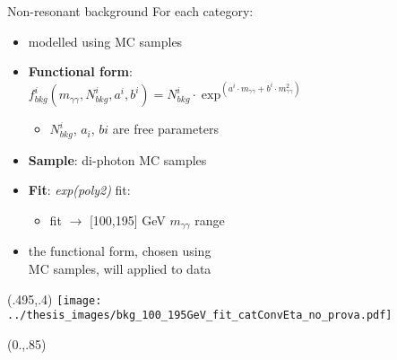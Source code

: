 \documentclass[10pt,UKenglish, leqno, xcolor = dvipsnames]{beamer}
\begin{document}
	\begin{frame}{Non-resonant background}
		\vfill
		For each category:
		\begin{itemize}
			\item modelled using MC samples
			\item \textbf{Functional form}:\\ $f^i_{bkg}(m_{\gamma\gamma},N_{bkg}^i,a^i,b^i) = N_{bkg}^i\cdot\exp^{(a^i\cdot m_{\gamma\gamma}+b^i\cdot m_{\gamma\gamma}^2)}$
			\begin{itemize}
				\item $N^{i}_{bkg}$, $a_i$, $bi$ are free parameters
			\end{itemize} 
			\item \textbf{Sample}: di-photon MC samples
			\item \textbf{Fit}: \textit{exp(poly2)} fit:
			\begin{itemize}
				\item fit $\to$  [100,195] GeV $m_{\gamma\gamma}$ range
			\end{itemize}
			\item the functional form, chosen using\\ MC samples, will applied to data
		\end{itemize}
		\vspace{.5cm}
		\vfill
		\begin{textblock}{1}(.495,.4)
			\texttt{[image: ../thesis\_images/bkg\_100\_195GeV\_fit\_catConvEta\_no\_prova.pdf]}\\	
		\end{textblock}
		\begin{textblock}{1}(0.,.85)
			\begin{figure}
			\end{figure}
		\end{textblock}
	\end{frame}
	
\end{document}
